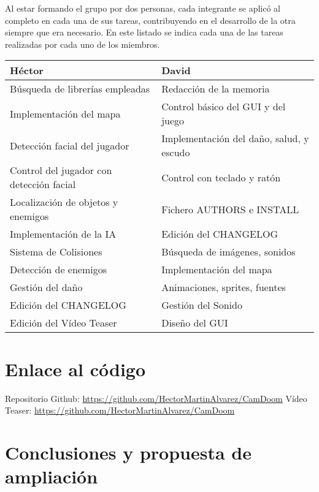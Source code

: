 \documentclass{article}
\begin{document}
Al estar formando el grupo por dos personas, cada integrante se aplicó al completo en cada una de sus
tareas, contribuyendo en el desarrollo de la otra siempre que era necesario. En este listado se indica
cada una de las tareas realizadas por cada uno de los miembros.

\begin{table}[H]
    \centering
    \begin{tabular}{|l|l|}
        \hline
        \textbf{Héctor} & \textbf{David} \\
        \hline
        Búsqueda de librerías empleadas & Redacción de la memoria \\
        \hline
        Implementación del mapa & Control básico del GUI y del juego \\
        \hline
        Detección facial del jugador & Implementación del daño, salud, y escudo \\
        \hline
        Control del jugador con detección facial & Control con teclado y ratón \\
        \hline
        Localización de objetos y enemigos & Fichero AUTHORS e INSTALL \\
        \hline
        Implementación de la IA & Edición del CHANGELOG \\
        \hline
        Sistema de Colisiones & Búsqueda de imágenes, sonidos \\
        \hline
        Detección de enemigos & Implementación del mapa \\
        \hline
        Gestión del daño & Animaciones, sprites, fuentes \\
        \hline
        Edición del CHANGELOG & Gestión del Sonido \\
        \hline
        Edición del Vídeo Teaser & Diseño del GUI \\
        \hline
    \end{tabular}
\end{table}

\section{Enlace al código}

Repositorio Github: \url{https://github.com/HectorMartinAlvarez/CamDoom}
Vídeo Teaser: \url{https://github.com/HectorMartinAlvarez/CamDoom}

\section{Conclusiones y propuesta de ampliación}
\end{document}
